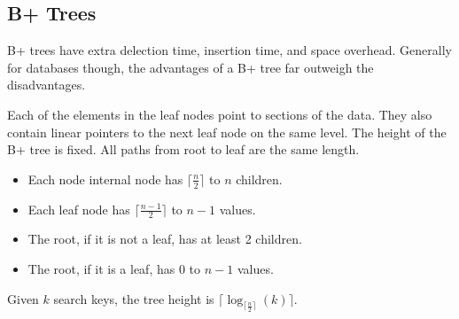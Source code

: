 \documentclass{math}
\begin{document}
\subsection*{B+ Trees}
B+ trees have extra delection time, insertion time, and space overhead.
Generally for databases though, the advantages of a B+ tree far outweigh the
disadvantages.
\begin{center}
  \scalebox{0.8}{
  \begin{forest}
    [Mozart
      [Einstein|Gold
        [Brandt|Cali|Crick]
        [Einstein|ElSaid]
        [Gold|Katz|Kim]
      ]
      [Snu
        [Mozart|Singh]
        [Snu|Wu]
      ]
    ]
  \end{forest}}
\end{center}
Each of the elements in the leaf nodes point to sections of the data. They also
contain linear pointers to the next leaf node on the same level. The height of
the B+ tree is fixed. All paths from root to leaf are the same length.
\begin{itemize}
  \item Each node internal node has \( \lceil\frac{n}{2}\rceil \) to \( n \)
    children.
  \item Each leaf node has \( \lceil\frac{n-1}{2}\rceil \) to \( n-1 \) values.
  \item The root, if it is not a leaf, has at least 2 children.
  \item The root, if it is a leaf, has 0 to \( n-1 \) values.
\end{itemize}
Given \( k \) search keys, the tree height is
\( \lceil\log_{\lceil\frac{n}{2}\rceil}(k)\rceil \).
\end{document}
